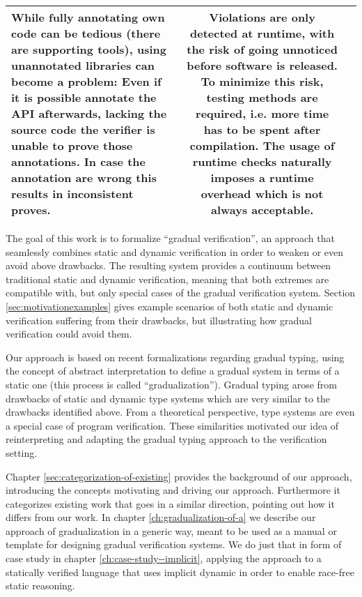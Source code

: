 \begin{tabular}{l | c | c}
\begin{minipage}{170pt}
        While fully annotating own code can be tedious (there are supporting tools), using unannotated libraries can become a problem:
        Even if it is possible annotate the API afterwards, lacking the source code the verifier is unable to prove those annotations.
        In case the annotation are wrong this results in inconsistent proves.
        \vspace{5pt}
    \end{minipage}
    &
    \begin{minipage}{170pt}
        \vspace{3pt}
        Violations are only detected at runtime, with the risk of going unnoticed before software is released.
        To minimize this risk, testing methods are required, i.e. more time has to be spent after compilation.
        The usage of runtime checks naturally imposes a runtime overhead which is not always acceptable.
        \vspace{5pt}
    \end{minipage}\\\hline
\end{tabular}

The goal of this work is to formalize “gradual verification”, an approach that seamlessly combines static and dynamic verification in order to weaken or even avoid above drawbacks.
The resulting system provides a continuum between traditional static and dynamic verification, meaning that both extremes are compatible with, but only special cases of the gradual verification system.
Section \ref{sec:motivationexamples} gives example scenarios of both static and dynamic verification suffering from their drawbacks, but illustrating how gradual verification could avoid them.

Our approach is based on recent formalizations regarding gradual typing, using the concept of abstract interpretation to define a gradual system in terms of a static one (this process is called “gradualization”).
Gradual typing arose from drawbacks of static and dynamic type systems which are very similar to the drawbacks identified above.
From a theoretical perspective, type systems are even a special case of program verification. 
These similarities motivated our idea of reinterpreting and adapting the gradual typing approach to the verification setting.

Chapter \ref{sec:categorization-of-existing} provides the background of our approach, introducing the concepts motivating and driving our approach.
Furthermore it categorizes existing work that goes in a similar direction, pointing out how it differs from our work.
In chapter \ref{ch:gradualization-of-a} we describe our approach of gradualization in a generic way, meant to be used as a manual or template for designing gradual verification systems.
We do just that in form of case study in chapter \ref{ch:case-study--implicit}, applying the approach to a statically verified language that uses implicit dynamic in order to enable race-free static reasoning.


